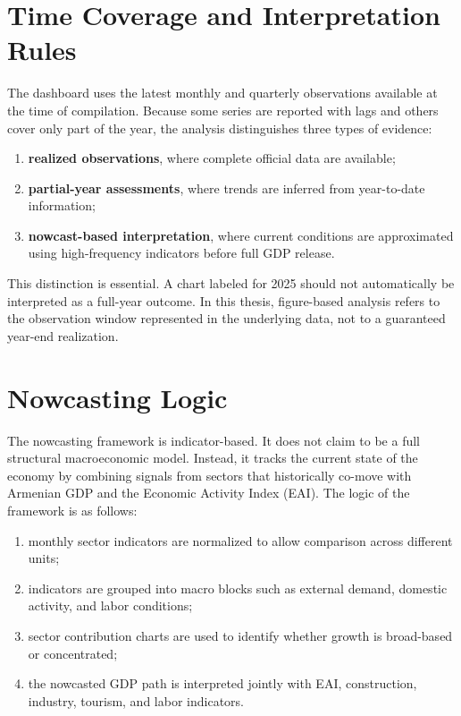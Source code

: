\documentclass[12pt,a4paper]{report}
\begin{document}
\section{Time Coverage and Interpretation Rules}
The dashboard uses the latest monthly and quarterly observations available at the time of compilation. Because some series are reported with lags and others cover only part of the year, the analysis distinguishes three types of evidence:
\begin{enumerate}
    \item \textbf{realized observations}, where complete official data are available;
    \item \textbf{partial-year assessments}, where trends are inferred from year-to-date information;
    \item \textbf{nowcast-based interpretation}, where current conditions are approximated using high-frequency indicators before full GDP release.
\end{enumerate}

This distinction is essential. A chart labeled for 2025 should not automatically be interpreted as a full-year outcome. In this thesis, figure-based analysis refers to the observation window represented in the underlying data, not to a guaranteed year-end realization.

\section{Nowcasting Logic}
The nowcasting framework is indicator-based. It does not claim to be a full structural macroeconomic model. Instead, it tracks the current state of the economy by combining signals from sectors that historically co-move with Armenian GDP and the Economic Activity Index (EAI). The logic of the framework is as follows:
\begin{enumerate}
    \item monthly sector indicators are normalized to allow comparison across different units;
    \item indicators are grouped into macro blocks such as external demand, domestic activity, and labor conditions;
    \item sector contribution charts are used to identify whether growth is broad-based or concentrated;
    \item the nowcasted GDP path is interpreted jointly with EAI, construction, industry, tourism, and labor indicators.
\end{enumerate}
\end{document}
